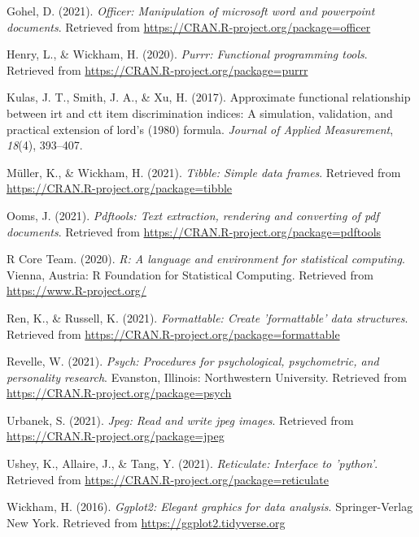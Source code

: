 \documentclass[
  english,
  man,floatsintext]{apa6}
\begin{document}
\leavevmode\hypertarget{ref-R-officer}{}%
Gohel, D. (2021). \emph{Officer: Manipulation of microsoft word and powerpoint documents}. Retrieved from \url{https://CRAN.R-project.org/package=officer}

\leavevmode\hypertarget{ref-R-purrr}{}%
Henry, L., \& Wickham, H. (2020). \emph{Purrr: Functional programming tools}. Retrieved from \url{https://CRAN.R-project.org/package=purrr}

\leavevmode\hypertarget{ref-kulas2017approximate}{}%
Kulas, J. T., Smith, J. A., \& Xu, H. (2017). Approximate functional relationship between irt and ctt item discrimination indices: A simulation, validation, and practical extension of lord's (1980) formula. \emph{Journal of Applied Measurement}, \emph{18}(4), 393--407.

\leavevmode\hypertarget{ref-R-tibble}{}%
Müller, K., \& Wickham, H. (2021). \emph{Tibble: Simple data frames}. Retrieved from \url{https://CRAN.R-project.org/package=tibble}

\leavevmode\hypertarget{ref-R-pdftools}{}%
Ooms, J. (2021). \emph{Pdftools: Text extraction, rendering and converting of pdf documents}. Retrieved from \url{https://CRAN.R-project.org/package=pdftools}

\leavevmode\hypertarget{ref-R-base}{}%
R Core Team. (2020). \emph{R: A language and environment for statistical computing}. Vienna, Austria: R Foundation for Statistical Computing. Retrieved from \url{https://www.R-project.org/}

\leavevmode\hypertarget{ref-R-formattable}{}%
Ren, K., \& Russell, K. (2021). \emph{Formattable: Create 'formattable' data structures}. Retrieved from \url{https://CRAN.R-project.org/package=formattable}

\leavevmode\hypertarget{ref-R-psych}{}%
Revelle, W. (2021). \emph{Psych: Procedures for psychological, psychometric, and personality research}. Evanston, Illinois: Northwestern University. Retrieved from \url{https://CRAN.R-project.org/package=psych}

\leavevmode\hypertarget{ref-R-jpeg}{}%
Urbanek, S. (2021). \emph{Jpeg: Read and write jpeg images}. Retrieved from \url{https://CRAN.R-project.org/package=jpeg}

\leavevmode\hypertarget{ref-R-reticulate}{}%
Ushey, K., Allaire, J., \& Tang, Y. (2021). \emph{Reticulate: Interface to 'python'}. Retrieved from \url{https://CRAN.R-project.org/package=reticulate}

\leavevmode\hypertarget{ref-R-ggplot2}{}%
Wickham, H. (2016). \emph{Ggplot2: Elegant graphics for data analysis}. Springer-Verlag New York. Retrieved from \url{https://ggplot2.tidyverse.org}
\end{document}

